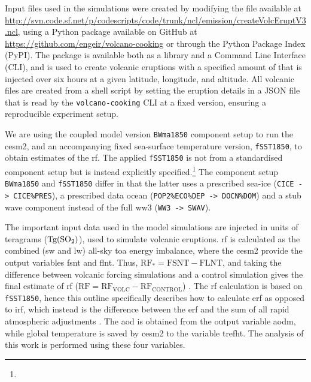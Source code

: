 \documentclass{ametsocV6.1}
\newcommand{\iso}[1][i]{{#1}njected \ce{SO2}}
\begin{document}


\appendix

\appendix[A]


Input files used in the simulations were created by modifying the file available at
\url{http://svn.code.sf.net/p/codescripts/code/trunk/ncl/emission/createVolcEruptV3.ncl},
using a Python package available on GitHub at
\url{https://github.com/engeir/volcano-cooking} or through the Python Package Index
(PyPI). The package is available both as a library and a Command Line Interface (CLI),
and is used to create volcanic eruptions with a specified amount of  that is
injected over six hours at a given latitude, longitude, and altitude. All volcanic
 files are created from a shell script by setting the eruption details in a JSON
file that is read by the \texttt{volcano-cooking} CLI at a fixed version, ensuring a
reproducible experiment setup.

We are using the coupled model version \texttt{BWma1850} component setup to run the
\gls{cesm2}, and an accompanying fixed sea-surface temperature version,
\texttt{fSST1850}, to obtain estimates of the \gls{rf}. The applied \texttt{fSST1850} is
not from a standardised component setup but is instead explicitly
specified.\footnote{\fssturl} The component setup \texttt{BWma1850} and
\texttt{fSST1850} differ in that the latter uses a prescribed sea-ice (\texttt{CICE ->
  CICE\%PRES}), a prescribed data ocean (\texttt{POP2\%ECO\%DEP -> DOCN\%DOM}) and a stub
wave component instead of the full \gls{ww3} (\texttt{WW3 -> SWAV}).

The important input data used in the model simulations are \iso{} in units of teragrams
(\(\si{\tera\gram(\ce{SO2})}\)), used to simulate volcanic eruptions. \gls{rf} is
calculated as the combined (\gls{sw} and \gls{lw}) all-sky \gls{toa} energy imbalance,
where the \gls{cesm2} provide the output variables \gls{fsnt} and \gls{flnt}. Thus,
\(\mathrm{RF_*}= \mathrm{FSNT} - \mathrm{FLNT}\), and taking the difference between
volcanic forcing simulations and a control simulation gives the final estimate of
\gls{rf} (\(\mathrm{RF}=\mathrm{RF_{VOLC}}-\mathrm{RF_{CONTROL}}\))
\citep{marshall2020}. The \gls{rf} calculation is based on \texttt{fSST1850}, hence this
outline specifically describes how to calculate \gls{erf} as opposed to \gls{irf}, which
instead is the difference between the \gls{erf} and the sum of all rapid atmospheric
adjustments \citep{marshall2020,smith2018}. The \gls{aod} is obtained from the output
variable \gls{aodm}, while global temperature is saved by \gls{cesm2} to the variable
\gls{trefht}. The analysis of this work is performed using these four variables.
\end{document}
